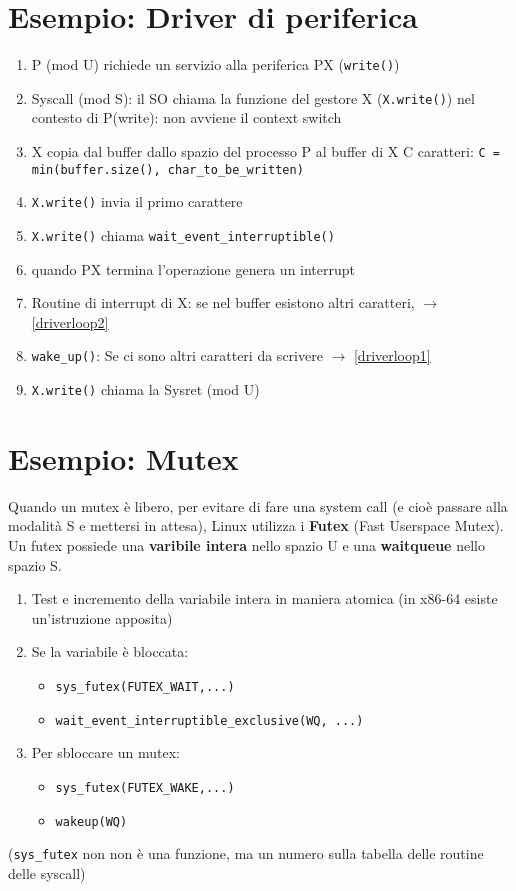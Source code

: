 \documentclass[12pt, a4paper]{report}
\begin{document}
\section{Esempio: Driver di periferica}
\begin{enumerate}
	\item P (mod U) richiede un servizio alla periferica PX
		(\texttt{write()})
	\item Syscall (mod S): il SO chiama la funzione del gestore X
		(\texttt{X.write()}) nel contesto di P(write): non avviene il
		context switch
	\item \label{driverloop1} X copia dal buffer dallo spazio del processo
		P al buffer di X C caratteri: \texttt{C = min(buffer.size(),
		char\_to\_be\_written)}
	\item \label{driverloop2} \texttt{X.write()} invia il primo carattere
	\item \texttt{X.write()} chiama \texttt{wait\_event\_interruptible()}
	\item quando PX termina l'operazione genera un interrupt
	\item Routine di interrupt di X: se nel buffer esistono altri caratteri,
		$\to$ \ref{driverloop2}
	\item \texttt{wake\_up()}: Se ci sono altri caratteri da scrivere $\to$
		\ref{driverloop1}
	\item \texttt{X.write()} chiama la Sysret (mod U)
\end{enumerate}

\section{Esempio: Mutex}
Quando un mutex è libero, per evitare di fare una system call (e cioè passare
alla modalità S e mettersi in attesa), Linux utilizza i \textbf{Futex}
(Fast Userspace Mutex). Un futex possiede una \textbf{varibile intera} nello
spazio U e una \textbf{waitqueue} nello spazio S.
\begin{enumerate}
	\item Test e incremento della variabile intera in maniera atomica (in x86-64
		esiste un'istruzione  apposita)
	\item Se la variabile è bloccata:
		\begin{itemize}
			\item \texttt{sys\_futex(FUTEX\_WAIT,...)}
			\item \texttt{wait\_event\_interruptible\_exclusive(WQ, ...)}
		\end{itemize}
	\item Per sbloccare un mutex:
		\begin{itemize}
			\item \texttt{sys\_futex(FUTEX\_WAKE,...)}
			\item \texttt{wakeup(WQ)}
		\end{itemize}
\end{enumerate}
(\texttt{sys\_futex} non non è una funzione, ma un numero sulla tabella delle
routine delle syscall)
\end{document}
